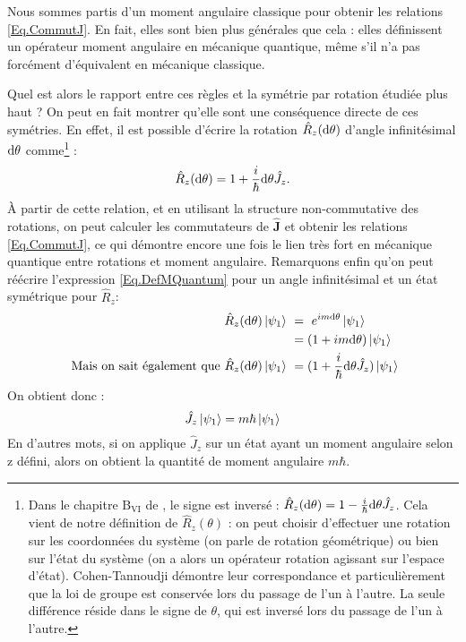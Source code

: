 Nous sommes partis d'un moment angulaire classique pour obtenir les relations \ref{Eq.CommutJ}. En fait, elles sont bien plus générales que cela : elles définissent un opérateur moment angulaire en mécanique quantique, même s'il n'a pas forcément d'équivalent en mécanique classique.

Quel est alors le rapport entre ces règles et la symétrie par rotation étudiée plus haut ? On peut en fait montrer qu'elle sont une conséquence directe de ces symétries. En effet, il est possible d'écrire la rotation $\hat{R}_z(\mathrm{d}\theta)$ d'angle infinitésimal $\mathrm{d}\theta$ comme\footnote{Dans le chapitre $\text{B}_{\text{VI}}$ de , le signe est inversé : $\hat{R}_z(\mathrm{d}\theta) = 1-\frac{i}{\hbar}\mathrm{d} \theta \hat{J}_z$. Cela vient de notre définition de $\hat{R}_z(\theta)$ : on peut choisir d'effectuer une rotation sur les coordonnées du système (on parle de rotation géométrique) ou bien sur l'état du système (on a alors un opérateur rotation agissant sur l'espace d'état). Cohen-Tannoudji démontre leur correspondance et particulièrement que la loi de groupe est conservée lors du passage de l'un à l'autre. La seule différence réside dans le signe de $\theta$, qui est inversé lors du passage de l'un à l'autre.} :
\begin{equation*}
\hat{R}_z(\mathrm{d}\theta) = 1+\frac{i}{\hbar}\mathrm{d} \theta \hat{J}_z.
\end{equation*}
\`A partir de cette relation, et en utilisant la structure non-commutative des rotations, on peut calculer les commutateurs de $\bm{\hat{J}}$ et obtenir les relations \ref{Eq.CommutJ}, ce qui démontre encore une fois le lien très fort en mécanique quantique entre rotations et moment angulaire. Remarquons enfin qu'on peut réécrire l'expression \ref{Eq.DefMQuantum} pour un angle infinitésimal et un état symétrique pour $\hat{R}_z$:
\begin{align*}
\hat{R}_z(\mathrm{d}\theta)\ket{\psi_1}~&=~e^{im\mathrm{d}\theta}\ket{\psi_1}\\
~&=(1+im\mathrm{d}\theta)\ket{\psi_1}\\
\mbox{ Mais on sait également que }\hat{R}_z(\mathrm{d}\theta)\ket{\psi_1}~&=(1+\frac{i}{\hbar}\mathrm{d} \theta \hat{J}_z)\ket{\psi_1}
\end{align*}
On obtient donc : 
\begin{equation*}
\hat{J}_z\ket{\psi_1} = m\hbar\ket{\psi_1}
\end{equation*}
En d'autres mots, si on applique $\hat{J}_z$ sur un état ayant un moment angulaire selon z défini, alors on obtient la quantité de moment angulaire $m\hbar$. 

